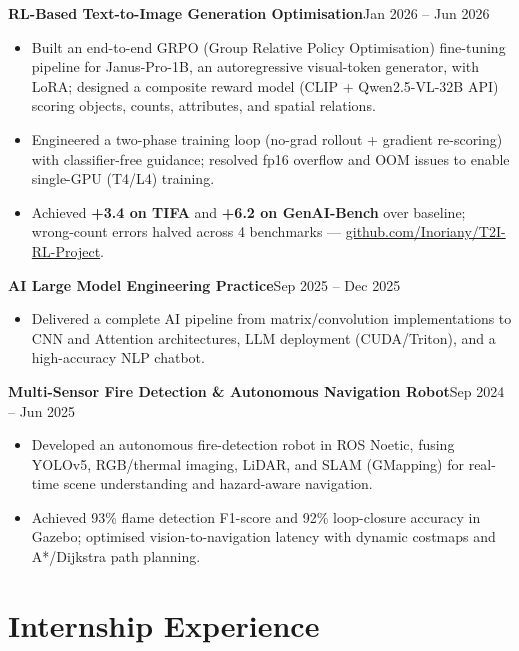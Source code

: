 \documentclass[a4paper,10pt]{article}
\newcommand{\entry}[2]{%
  \noindent\textbf{#1}\hfill#2\par%
}
\begin{document}
\vspace{3pt}
\entry{RL-Based Text-to-Image Generation Optimisation}{Jan 2026 -- Jun 2026}
\begin{itemize}
  \item Built an end-to-end GRPO (Group Relative Policy Optimisation) fine-tuning pipeline for Janus-Pro-1B, an autoregressive visual-token generator, with LoRA; designed a composite reward model (CLIP + Qwen2.5-VL-32B API) scoring objects, counts, attributes, and spatial relations.
  \item Engineered a two-phase training loop (no-grad rollout + gradient re-scoring) with classifier-free guidance; resolved fp16 overflow and OOM issues to enable single-GPU (T4/L4) training.
  \item Achieved \textbf{+3.4 on TIFA} and \textbf{+6.2 on GenAI-Bench} over baseline; wrong-count errors halved across 4 benchmarks --- \href{https://github.com/Inoriany/T2I-RL-Project}{github.com/Inoriany/T2I-RL-Project}.
\end{itemize}

\vspace{3pt}
\entry{AI Large Model Engineering Practice}{Sep 2025 -- Dec 2025}
\begin{itemize}
  \item Delivered a complete AI pipeline from matrix/convolution implementations to CNN and Attention architectures, LLM deployment (CUDA/Triton), and a high-accuracy NLP chatbot.
\end{itemize}

\vspace{3pt}
\entry{Multi-Sensor Fire Detection \& Autonomous Navigation Robot}{Sep 2024 -- Jun 2025}
\begin{itemize}
  \item Developed an autonomous fire-detection robot in ROS Noetic, fusing YOLOv5, RGB/thermal imaging, LiDAR, and SLAM (GMapping) for real-time scene understanding and hazard-aware navigation.
  \item Achieved 93\% flame detection F1-score and 92\% loop-closure accuracy in Gazebo; optimised vision-to-navigation latency with dynamic costmaps and A*/Dijkstra path planning.
\end{itemize}

\section*{Internship Experience}
\end{document}
